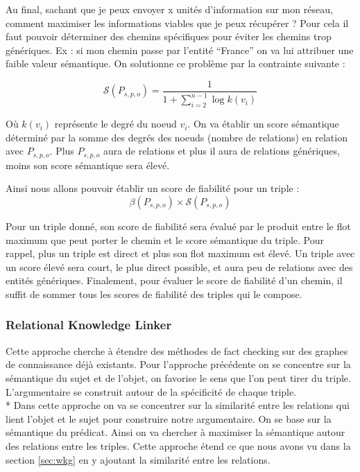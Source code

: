 Au final, sachant que je peux envoyer x unités d'information sur mon réseau, comment maximiser les informations viables que je peux récupérer ? Pour cela il faut pouvoir déterminer des chemins spécifiques pour éviter les chemins trop génériques. Ex : si mon chemin passe par l'entité \enquote{France} on va lui attribuer une faible valeur sémantique. On solutionne ce problème par la contrainte suivante :

\begin{equation}
   \mathcal{S}(P_{s,p,o}) = \frac{1}{1 + \sum\limits_{i=2}^{n-1} \log k(v_{i})}
\end{equation}

Où $ k(v_{i}) $ représente le degré du noeud $ v_{i} $. On va établir un score sémantique déterminé par la somme des degrés des noeuds (nombre de relations) en relation avec $ P_{s,p,o} $. Plus $ P_{s,p,o} $ aura de relations et plus il aura de relations génériques, moins son score sémantique sera élevé.

Ainsi nous allons pouvoir établir un score de fiabilité pour un triple :
\begin{equation}
   \beta(P_{s,p,o}) \times \mathcal{S}(P_{s,p,o})
\end{equation}

Pour un triple donné, son score de fiabilité sera évalué par le produit entre le flot maximum que peut porter le chemin et le score sémantique du triple. Pour rappel, plus un triple est direct et plus son flot maximum est élevé. Un triple avec un score élevé sera court, le plus direct possible, et aura peu de relations avec des entités génériques. Finalement, pour évaluer le score de fiabilité d'un chemin, il suffit de sommer tous les scores de fiabilité des triples qui le compose.

\subsubsection{Relational Knowledge Linker}

Cette approche cherche à étendre des méthodes de fact checking sur des graphes de connaissance déjà existants.
Pour l'approche précédente on se concentre sur la sémantique du sujet et de l'objet, on favorise le sens que l'on peut tirer du triple. L'argumentaire se construit autour de la spécificité de chaque triple.
\\*
Dans cette approche on va se concentrer sur la similarité entre les relations qui lient l'objet et le sujet pour construire notre argumentaire. On se base sur la sémantique du prédicat. Ainsi on va chercher à maximiser la sémantique autour des relations entre les triples. Cette approche étend ce que nous avons vu dans la section \ref{sec:wkg} en y ajoutant la similarité entre les relations.

